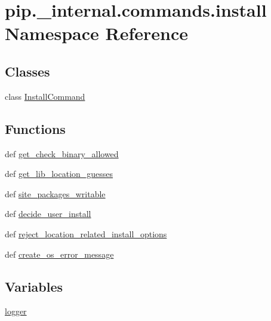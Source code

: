 \hypertarget{namespacepip_1_1__internal_1_1commands_1_1install}{}\section{pip.\+\_\+internal.\+commands.\+install Namespace Reference}
\label{namespacepip_1_1__internal_1_1commands_1_1install}
\subsection*{Classes}
\begin{DoxyCompactItemize}
\item 
class \hyperlink{classpip_1_1__internal_1_1commands_1_1install_1_1InstallCommand}{Install\+Command}
\end{DoxyCompactItemize}
\subsection*{Functions}
\begin{DoxyCompactItemize}
\item 
def \hyperlink{namespacepip_1_1__internal_1_1commands_1_1install_a99bfc22d15713e3e7d4c8a400471de55}{get\+\_\+check\+\_\+binary\+\_\+allowed}
\item 
def \hyperlink{namespacepip_1_1__internal_1_1commands_1_1install_a668cb6318bb34fe9cfbd3776944da549}{get\+\_\+lib\+\_\+location\+\_\+guesses}
\item 
def \hyperlink{namespacepip_1_1__internal_1_1commands_1_1install_a3ebcb9bae2dad7fe19fe60932fc9bd9e}{site\+\_\+packages\+\_\+writable}
\item 
def \hyperlink{namespacepip_1_1__internal_1_1commands_1_1install_a4d7e96e6154fe21badc80afd5f9365eb}{decide\+\_\+user\+\_\+install}
\item 
def \hyperlink{namespacepip_1_1__internal_1_1commands_1_1install_af3f4ae715c1847dbdfcfca77c98f311b}{reject\+\_\+location\+\_\+related\+\_\+install\+\_\+options}
\item 
def \hyperlink{namespacepip_1_1__internal_1_1commands_1_1install_adc0172dcdca5d49809b7ea4fe4fba1da}{create\+\_\+os\+\_\+error\+\_\+message}
\end{DoxyCompactItemize}
\subsection*{Variables}
\begin{DoxyCompactItemize}
\item 
\hyperlink{namespacepip_1_1__internal_1_1commands_1_1install_ad7595e6e1fc064fd23ff74642000f0df}{logger}
\end{DoxyCompactItemize}


